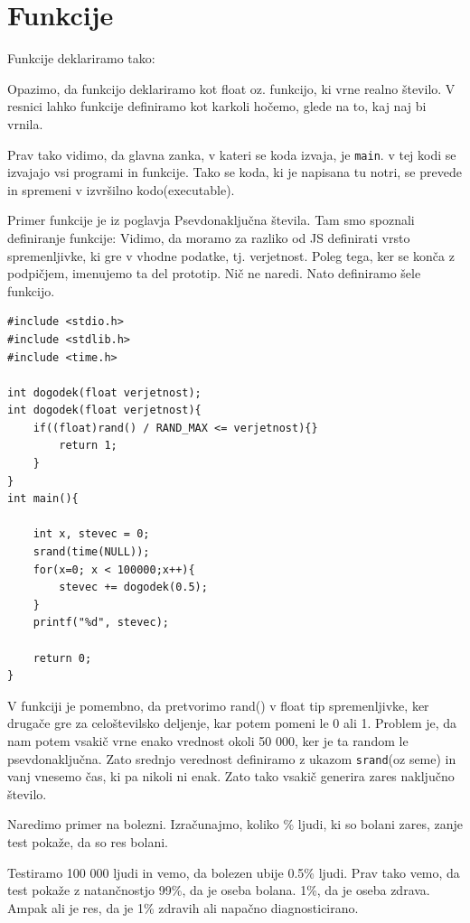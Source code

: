 \documentclass[a4paper, 12pt]{article}
\begin{document}
\pagebreak
\section{Funkcije}
Funkcije deklariramo tako:

\begin{center}
\end{center}

Opazimo, da funkcijo deklariramo kot float oz. funkcijo, ki vrne realno število. V resnici lahko funkcije definiramo kot karkoli hočemo, glede na to, kaj naj bi vrnila.

Prav tako vidimo, da glavna zanka, v kateri se koda izvaja, je \texttt{main}. v tej kodi se izvajajo vsi programi in funkcije. Tako se koda, ki je napisana tu notri, se prevede in spremeni v izvršilno kodo(executable).

Primer funkcije je iz poglavja Psevdonaključna števila. Tam smo spoznali definiranje funkcije:
 Vidimo, da moramo za razliko od JS definirati vrsto spremenljivke, ki gre v vhodne podatke, tj. verjetnost. Poleg tega, ker se konča z podpičjem, imenujemo ta del prototip. Nič ne naredi. Nato definiramo šele funkcijo.

\begin{lstlisting}
#include <stdio.h>
#include <stdlib.h>
#include <time.h>

int dogodek(float verjetnost);
int dogodek(float verjetnost){
	if((float)rand() / RAND_MAX <= verjetnost){}
		return 1;
	}
}
int main(){

	int x, stevec = 0;
	srand(time(NULL));
	for(x=0; x < 100000;x++){
		stevec += dogodek(0.5);
	}
	printf("%d", stevec);

	return 0;
}
\end{lstlisting}

V funkciji je pomembno, da pretvorimo rand() v float tip spremenljivke, ker drugače gre za celoštevilsko deljenje, kar potem pomeni le 0 ali 1. Problem je, da nam potem vsakič vrne enako vrednost okoli 50 000, ker je ta random le psevdonaključna. Zato srednjo verednost definiramo z ukazom \texttt{srand}(oz seme) in vanj vnesemo čas, ki pa nikoli ni enak. Zato tako vsakič generira zares naključno število.

Naredimo primer na bolezni. Izračunajmo, koliko \% ljudi, ki so bolani zares, zanje test pokaže, da so res bolani.

Testiramo 100 000 ljudi in vemo, da bolezen ubije 0.5\% ljudi. Prav tako vemo, da test pokaže z natančnostjo 99\%, da je oseba bolana. 1\%, da je oseba zdrava. Ampak ali je res, da je 1\% zdravih ali napačno diagnosticirano.
\end{document}
